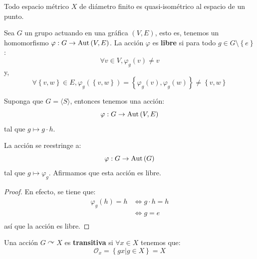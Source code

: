 \documentclass[12pt]{report}
\newcounter{it}
\theoremstyle{largebreak}
\newcommand\cf[3]{\ensuremath{#1:#2\rightarrow#3}}
\newcommand\Aut[1]{\ensuremath{\textup{Aut}\left(#1\right)}}
\newcommand{\gen}[1]{\ensuremath{\langle#1\rangle}}
\begin{document}
    \begin{exa}
        Todo espacio métrico $X$ de diámetro finito es quasi-isométrico al espacio de un punto.
    \end{exa}

    \begin{mydef}
        Sea $G$ un grupo actuando en una gráfica $(V,E)$, esto es, tenemos un homomorfismo $\cf{\varphi}{G}{\Aut{V,E}}$. La acción $\varphi$ es \textbf{libre} si para todo $g\in G\setminus\left\{e\right\}$:
        \begin{equation*}
            \forall v\in V, \varphi_g(v)\neq v
        \end{equation*}
        y,
        \begin{equation*}
            \forall\left\{v,w \right\}\in E,\varphi_g\left(\left\{v,w \right\}\right)=\left\{\varphi_g(v),\varphi_g(w) \right\}\neq \left\{v,w \right\}
        \end{equation*}
    \end{mydef}

    \begin{exa}
        Suponga que $G=\gen{S}$, entonces tenemos una acción:
        \begin{equation*}
            \cf{\varphi}{G}{\Aut{V,E}}
        \end{equation*}
        tal que $g\mapsto g\cdot h$.
    \end{exa}

    \begin{obs}
        La acción se reestringe a:
        \begin{equation*}
            \cf{\varphi}{G}{\Aut{G}}
        \end{equation*}
        tal que $g\mapsto\varphi_g$. Afirmamos que esta acción es libre.
    \end{obs}

    \begin{proof}
        En efecto, se tiene que:
        \begin{equation*}
            \begin{split}
                \varphi_g(h)=h&\iff g\cdot h=h\\
                &\iff g=e\\
            \end{split}
        \end{equation*}
        así que la acción es libre.
    \end{proof}

    \begin{mydef}
        Una acción $G\curvearrowright X$ es \textbf{transitiva} si $\forall x\in X$ tenemos que:
        \begin{equation*}
            \mathcal{O}_x=\left\{gx\Big|g\in X \right\}=X
        \end{equation*}
    \end{mydef}
\end{document}
